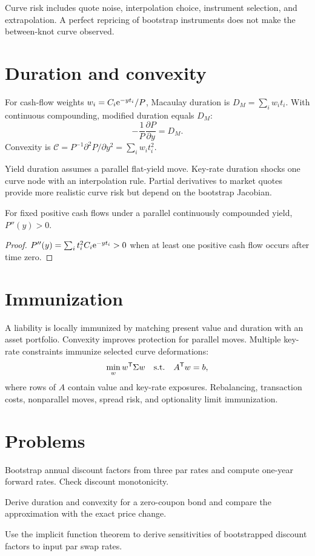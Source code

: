 Curve risk includes quote noise, interpolation choice, instrument selection, and
extrapolation. A perfect repricing of bootstrap instruments does not make the
between-knot curve observed.

\section{Duration and convexity}

For cash-flow weights
$w_i=C_i\mathrm e^{-yt_i}/P$, Macaulay duration is
$D_M=\sum_iw_it_i$. With continuous compounding, modified duration equals $D_M$:
\[
-\frac1P\frac{\partial P}{\partial y}=D_M.
\]
Convexity is
$\mathcal C=P^{-1}\partial^2P/\partial y^2=\sum_iw_it_i^2$.

Yield duration assumes a parallel flat-yield move. Key-rate duration shocks one
curve node with an interpolation rule. Partial derivatives to market quotes provide
more realistic curve risk but depend on the bootstrap Jacobian.

\begin{proposition}
For fixed positive cash flows under a parallel continuously compounded yield,
$P''(y)>0$.
\end{proposition}
\begin{proof}
$P''(y)=\sum_i t_i^2C_i\mathrm e^{-yt_i}>0$ when at least one positive cash flow occurs
after time zero.
\end{proof}

\section{Immunization}

A liability is locally immunized by matching present value and duration with an
asset portfolio. Convexity improves protection for parallel moves. Multiple
key-rate constraints immunize selected curve deformations:
\[
\min_w w^\mathsf T\Sigma w
\quad\text{s.t.}\quad
A^\mathsf T w=b,
\]
where rows of $A$ contain value and key-rate exposures. Rebalancing, transaction
costs, nonparallel moves, spread risk, and optionality limit immunization.

\section{Problems}

\begin{exercise}
Bootstrap annual discount factors from three par rates and compute one-year forward
rates. Check discount monotonicity.
\end{exercise}
\begin{exercise}
Derive duration and convexity for a zero-coupon bond and compare the approximation
with the exact price change.
\end{exercise}
\begin{exercise}
Use the implicit function theorem to derive sensitivities of bootstrapped discount
factors to input par swap rates.
\end{exercise}


